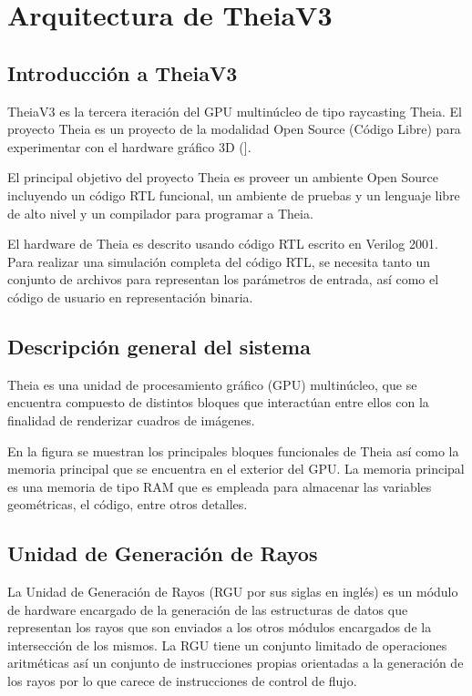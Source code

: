 
\section{Arquitectura de TheiaV3}
\subsection{Introducción a TheiaV3}
TheiaV3 es la tercera iteración del GPU multinúcleo de tipo raycasting Theia. El proyecto Theia es un proyecto de la modalidad Open Source (Código Libre) para experimentar con el hardware gráfico 3D (\cite{Valverde}].

El principal objetivo del proyecto Theia es proveer un ambiente Open Source incluyendo un código RTL funcional, un ambiente de pruebas y un lenguaje libre de alto nivel y un compilador para programar a Theia.

El hardware de Theia es descrito usando código RTL escrito en Verilog 2001. Para realizar una simulación completa del código RTL, se necesita tanto un conjunto de archivos para representan los parámetros de entrada, así como el código de usuario en representación binaria.  

\subsection{Descripción general del sistema}

Theia es una unidad de procesamiento gráfico (GPU) multinúcleo, que se encuentra compuesto de distintos bloques que interactúan entre ellos con la finalidad de renderizar cuadros de imágenes.

En la figura se muestran los principales bloques funcionales de Theia así como la memoria principal que se encuentra en el exterior del GPU. La memoria principal es una memoria de tipo RAM que es empleada para almacenar las variables geométricas, el código, entre otros detalles.

\subsection{Unidad de Generación de Rayos}

La Unidad de Generación de Rayos (RGU por sus siglas en inglés) es un módulo de hardware encargado de la generación de las estructuras de datos que representan los rayos que son enviados a los otros módulos encargados de la intersección de los mismos. La RGU tiene un conjunto limitado de operaciones aritméticas así un conjunto de instrucciones propias orientadas a la generación de los rayos por lo que carece de instrucciones de control de flujo.  

